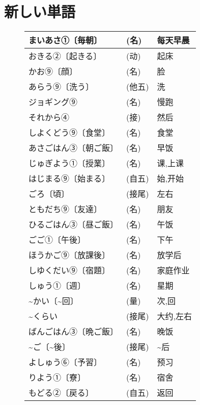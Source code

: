 
\usepackage{../../lectures_preamble}


    \section{新しい単語}
    \begin{figure}[htbp]
        \centering
        \begin{tabular}{l|l|l}
            まいあさ①〔毎朝〕 & (名) & 每天早晨\\\hline
            おきる②〔起きる〕 & (动) & 起床\\\hline
            かお⑨〔顔〕 & (名) & 脸\\\hline
            あらう⑨〔洗う〕 & (他五) & 洗\\\hline
            ジョギング⑨ & (名) & 慢跑\\\hline
            それから④ & (接) & 然后\\\hline
            しよくどう⑨〔食堂〕 & (名) & 食堂\\\hline
            あさごはん③〔朝ご飯〕 & (名) & 早饭\\\hline
            じゅぎよう①〔授業〕 & (名) & 课,上课\\\hline
            はじまる⑨〔始まる〕 & (自五) & 始,开始\\\hline
            ごろ〔頃〕 & (接尾) & 左右\\\hline
            ともだち⑨〔友達〕 & (名) & 朋友\\\hline
            ひるごはん③〔昼ご飯〕 & (名) & 午饭\\\hline
            ごご①〔午後〕 & (名) & 下午\\\hline
            ほうかご⑨〔放課後〕 & (名) & 放学后\\\hline
            しゆくだい⑨〔宿題〕 & (名) & 家庭作业\\\hline
            しゅう①〔週〕 & (名) & 星期\\\hline
            \~{}かい〔\~{}回〕 & (量) & 次,回\\\hline
            \~{}くらい & (接尾) & 大约,左右\\\hline
            ばんごはん③〔晩ご飯〕 & (名) & 晚饭\\\hline
            \~{}ご〔\~{}後〕 & (接尾) & \~{}后\\\hline
            よしゅう⑥〔予習〕 & (名) & 预习\\\hline
            りよう①〔寮〕 & (名) & 宿舍\\\hline
            もどる②〔戻る〕 & (自五) & 返回\\\hline

\end{tabular}
\end{figure}
